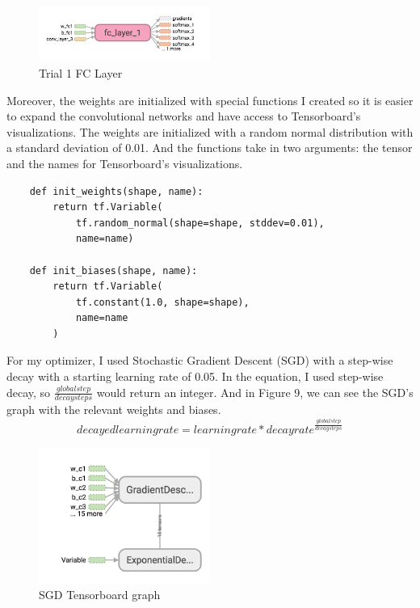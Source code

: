 \documentclass[twoside, column]{article}
\begin{document}
\begin{figure}
\caption{Trial 1 FC Layer}
\centering
\includegraphics[width=0.5\textwidth]{fc_trial_1}
\end{figure}

Moreover, the weights are initialized with special functions I created so it is easier to expand the convolutional networks and have access to Tensorboard's visualizations. The weights are initialized with a random normal distribution with a standard deviation of 0.01. And the functions take in two arguments: the tensor and the names for Tensorboard's visualizations.
\begin{verbatim}
    def init_weights(shape, name):
        return tf.Variable(
            tf.random_normal(shape=shape, stddev=0.01),
            name=name)

    def init_biases(shape, name):
        return tf.Variable(
            tf.constant(1.0, shape=shape),
            name=name
        )
\end{verbatim}
 
For my optimizer, I used Stochastic Gradient Descent (SGD) with a step-wise decay with a starting learning rate of 0.05. In the equation, I used step-wise decay, so $\frac {globalstep}{decaysteps}$ would return an integer. And in Figure 9, we can see the SGD's graph with the relevant weights and biases.
\begin{equation} \label{}
decayed learning rate = learningrate * decayrate^\frac{globalstep}{decaysteps}
\end{equation}

\begin{figure}
\caption{SGD Tensorboard graph}
\centering
\includegraphics[width=0.5\textwidth]{gd_trial_1}
\end{figure}
\end{document}
